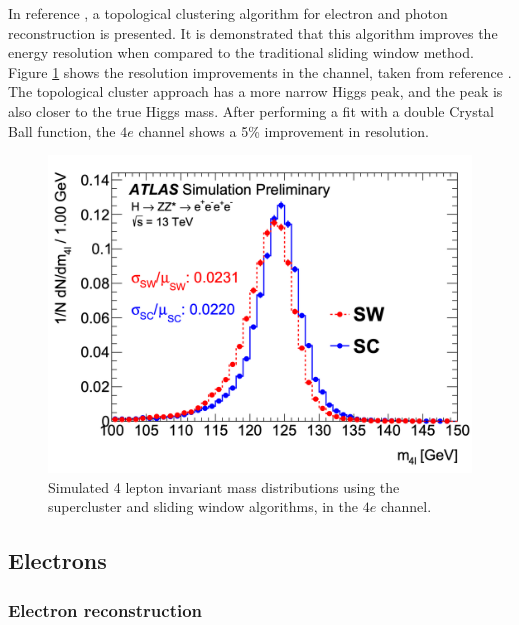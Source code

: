 In reference \cite{ATL-PHYS-PUB-2017-022}, a topological clustering algorithm for electron and photon reconstruction is presented. It is demonstrated that this algorithm improves the energy resolution when compared to the traditional sliding window method. Figure \ref{fig:H4l_topo_cluster} shows the resolution improvements in the \HFourL channel, taken from reference \cite{ATL-PHYS-PUB-2017-022}. The topological cluster approach has a more narrow Higgs peak, and the peak is also closer to the true Higgs mass. After performing a fit with a double Crystal Ball function, the $4e$ channel shows a 5\% improvement in resolution.
\begin{figure}
    \centering
    \includegraphics[width=\mediumfigwidth]{Figures/LHC/H4l_topo_cluster.png}
    \caption{Simulated 4 lepton invariant mass distributions using the supercluster and sliding window algorithms, in the $4e$ channel.}
    \label{fig:H4l_topo_cluster}
\end{figure}

\subsection{Electrons}

\subsubsection{Electron reconstruction}

